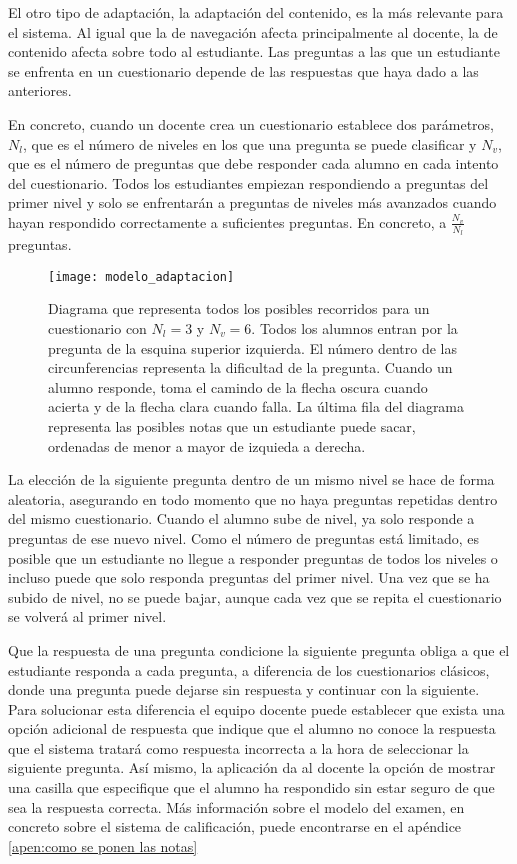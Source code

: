 El otro tipo de adaptación, la adaptación del contenido, es la más relevante para el sistema. Al igual que la de navegación afecta principalmente al docente, la de contenido afecta sobre todo al estudiante. Las preguntas a las que un estudiante se enfrenta en un cuestionario depende de las respuestas que haya dado a las anteriores.

En concreto, cuando un docente crea un cuestionario establece dos parámetros, $N_l$, que es el número de niveles en los que una pregunta se puede clasificar y $N_v$, que es el número de preguntas que debe responder cada alumno en cada intento del cuestionario. Todos los estudiantes empiezan respondiendo a preguntas del primer nivel y solo se enfrentarán a preguntas de niveles más avanzados cuando hayan respondido correctamente a suficientes preguntas. En concreto, a $\frac{N_v}{N_l}$ preguntas.

\begin{figure}[htp!]
	\centering
	\texttt{[image: modelo\_adaptacion]}
	\caption[Modelo de adpatación]{Diagrama que representa todos los posibles recorridos para un cuestionario con $N_l = 3$ y $N_v = 6$. Todos los alumnos entran por la pregunta de la esquina superior izquierda. El número dentro de las circunferencias representa la dificultad de la pregunta. Cuando un alumno responde, toma el camindo de la flecha oscura cuando acierta y de la flecha clara cuando falla. La última fila del diagrama representa las posibles notas que un estudiante puede sacar, ordenadas de menor a mayor de izquieda a derecha.}
	\label{fig:modelo de adaptacion}
\end{figure}

La elección de la siguiente pregunta dentro de un mismo nivel se hace de forma aleatoria, asegurando en todo momento que no haya preguntas repetidas dentro del mismo cuestionario. Cuando el alumno sube de nivel, ya solo responde a preguntas de ese nuevo nivel. Como el número de preguntas está limitado, es posible que un estudiante no llegue a responder preguntas de todos los niveles o incluso puede que solo responda preguntas del primer nivel. Una vez que se ha subido de nivel, no se puede bajar, aunque cada vez que se repita el cuestionario se volverá al primer nivel.

Que la respuesta de una pregunta condicione la siguiente pregunta obliga a que el estudiante responda a cada pregunta, a diferencia de los cuestionarios clásicos, donde una pregunta puede dejarse sin respuesta y continuar con la siguiente. Para solucionar esta diferencia el equipo docente puede establecer que exista una opción adicional de respuesta que indique que el alumno no conoce la respuesta que el sistema tratará como respuesta incorrecta a la hora de seleccionar la siguiente pregunta. Así mismo, la aplicación da al docente la opción de mostrar una casilla que especifique que el alumno ha respondido sin estar seguro de que sea la respuesta correcta. Más información sobre el modelo del examen, en concreto sobre el sistema de calificación, puede encontrarse en el apéndice \ref{apen:como se ponen las notas}

